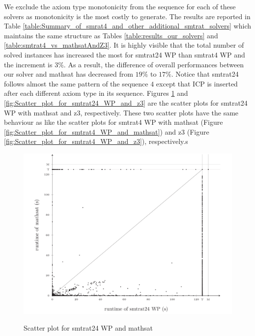 \noindent We exclude the axiom type monotonicity from the sequence for each of these solvers as monotonicity is the most costly to generate.
The results are reported in Table \ref{table:Summary_of_smrat4_and_other_additional_smtrat_solvers} which maintains the same structure as Tables \ref{table:results_our_solvers} and \ref{table:smtrat4_vs_mathsatAndZ3}.
It is highly visible that the total number of solved instances has increased the most for smtrat24 WP than smtrat4 WP and the increment is $3\%$.
As a result, the difference of overall performances between our solver and mathsat has decreased from $19\%$ to $17\%$.
Notice that smtrat24 follows almost the same pattern of the sequence $4$ except that ICP is inserted after each different axiom type in its sequence.
Figures \ref{fig:Scatter_plot_for_smtrat24_WP_and_mathsat} and \ref{fig:Scatter_plot_for_smtrat24_WP_and_z3} are the scatter plots for smtrat24 WP with mathsat and z3, respectively.
These two scatter plots have the same behaviour as like the scatter plots for smtrat4 WP with mathsat (Figure \ref{fig:Scatter_plot_for_smtrat4_WP_and_mathsat}) and z3 (Figure \ref{fig:Scatter_plot_for_smtrat4_WP_and_z3}), respectively.s\newline

\begin{figure}[]
    \centering
    \caption{Scatter plot for smtrat24 WP and mathsat}
    \includegraphics[width=1\linewidth]{./figures/scatter-smtrat_24_preprocessing-mathsat.pdf}
  \label{fig:Scatter_plot_for_smtrat24_WP_and_mathsat}
\end{figure}

